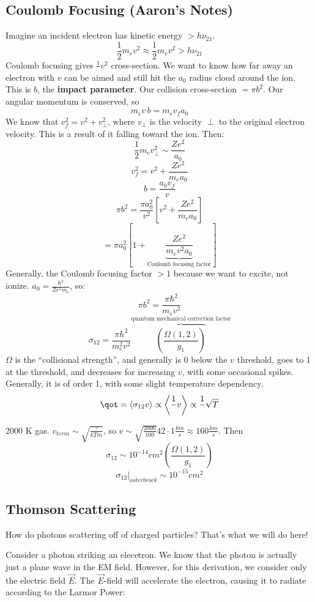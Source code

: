 \documentclass{article}
\def\sigot{\sigma_{12}}
\def\inv#1{\frac1{#1}}
\def\Efield{{\vec {E}}}
\def\eval#1{\big|_{#1}}
\def\inv#1{{\frac{1}{}#1}}
\def\mean#1{\left\langle {#1}\right\rangle}
\def\sigot{\sigma_{12}}
\def\eval#1{\big|_{#1}}
\begin{document}
\subsection{Coulomb Focusing (Aaron's Notes)}

Imagine an incident electron has kinetic energy $>h\nu_{21}$.
$$\frac12 m_rv^2 \approx \frac12 m_ev^2 > h\nu_{21}$$
Coulomb focusing gives $\inv{v^2}$ cross-section.
We want to know how far away an electron with $v$ can be aimed
and still hit the $a_0$ radius cloud around the ion.  This is $b$, the
{\bf impact parameter}.  Our collision cross-section $=\pi b^2$.  Our
angular momentum is conserved, so 
$$m_ev\,b=m_ev_fa_0$$
We know that $v_f^2 = v^2 + v_\perp^2$, where $v_\perp$ is the velocity
$\perp$ to the original electron velocity.  This is a result of it falling
toward the ion.  Then:
$$\frac12 m_ev_\perp^2 \sim \frac{Ze^2}{ a_0}$$
$$v_f^2 = v^2 + \frac{Ze^2}{ m_ea_0}$$
$$b=\frac{a_0v_f}{ v}$$
$$\pi b^2 = \frac{\pi a_0^2}{ v^2}\left[v^2+\frac{Ze^2}{ m_ea_0}\right]$$
$$= \pi a_0^2\left[1+\underbrace{\frac{Ze^2}{ m_ev^2a_0}}_\text{Coulomb focusing
factor}\right]$$
Generally, the Coulomb focusing factor $>1$ because we want to excite, not
ionize.  $a_0=\frac{\hbar^2}{ Ze^2m_e}$, so:
$$\pi b^2 = \frac{\pi\hbar^2}{ m_ev^2}$$
$$\sigot = \frac{\pi\hbar^2}{ m_e^2v^2}\overbrace{\left(\frac{\Omega(1,2) }{g_1}\right)}^\text{quantum  mechanical  correction factor}$$
$\Omega$ is the ``collisional strength'', and generally is 0 below the
$v$ threshold, goes to 1 at the threshold, and decreases for increasing
$v$, with some occasional spikes.  Generally, it is of order 1, with some
slight temperature dependency.
$$\qot=\mean{\sigot v} \propto \mean{\inv{v}} \propto \inv{\sqrt{T}}$$

2000 K gas.  $v_{term} \sim \sqrt{\frac{\gamma} {kT m}}$, so 
$v\sim \sqrt{\frac{2000 }{100}}42\cdot 1\frac{km}{ s} \approx 160\frac{km}{ s}$. Then
$$\sigot \sim 10^{-14}cm^2\left(\frac{\Omega(1,2)}{ g_1}\right)$$
$$\sigot\eval{osterbrock} \sim 10^{-15} cm^2$$

\subsection{Thomson Scattering}

How do photons scattering off of charged particles? That's what we will do here! 

Consider a photon striking an elecetron. We know that the photon is actually just a plane wave in the EM field. However, for this derivation, we consider only the electric field $\Efield$. The $\Efield$-field will accelerate the electron, causing it to radiate according to the Larmor Power:
\end{document}
